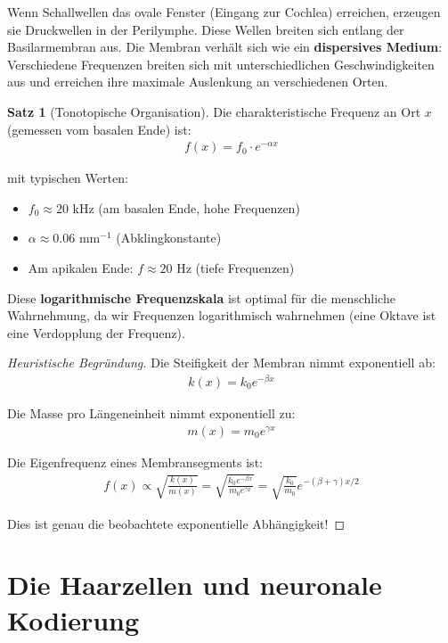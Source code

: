 ﻿\documentclass[a4paper,12pt]{report}
\theoremstyle{definition}
\newtheorem{satz}{Satz}
\begin{document}
	Wenn Schallwellen das ovale Fenster (Eingang zur Cochlea) erreichen, erzeugen sie Druckwellen in der Perilymphe. Diese Wellen breiten sich entlang der Basilarmembran aus. Die Membran verhält sich wie ein \textbf{dispersives Medium}: Verschiedene Frequenzen breiten sich mit unterschiedlichen Geschwindigkeiten aus und erreichen ihre maximale Auslenkung an verschiedenen Orten.
	
	\begin{satz}[Tonotopische Organisation]
		Die charakteristische Frequenz an Ort $x$ (gemessen vom basalen Ende) ist:
		\begin{align}
			f(x) = f_0 \cdot e^{-\alpha x}
		\end{align}
		
		mit typischen Werten:
		\begin{itemize}
			\item[-] $f_0 \approx 20$ kHz (am basalen Ende, hohe Frequenzen)
			\item[-] $\alpha \approx 0.06$ mm$^{-1}$ (Abklingkonstante)
			\item[-] Am apikalen Ende: $f \approx 20$ Hz (tiefe Frequenzen)
		\end{itemize}
		
		Diese \textbf{logarithmische Frequenzskala} ist optimal für die menschliche Wahrnehmung, da wir Frequenzen logarithmisch wahrnehmen (eine Oktave ist eine Verdopplung der Frequenz).
	\end{satz}
	
	\begin{proof}[Heuristische Begründung]
		Die Steifigkeit der Membran nimmt exponentiell ab:
		\begin{align}
			k(x) = k_0 e^{-\beta x}
		\end{align}
		
		Die Masse pro Längeneinheit nimmt exponentiell zu:
		\begin{align}
			m(x) = m_0 e^{\gamma x}
		\end{align}
		
		Die Eigenfrequenz eines Membransegments ist:
		\begin{align}
			f(x) \propto \sqrt{\frac{k(x)}{m(x)}} = \sqrt{\frac{k_0 e^{-\beta x}}{m_0 e^{\gamma x}}} = \sqrt{\frac{k_0}{m_0}} e^{-(\beta + \gamma)x/2}
		\end{align}
		
		Dies ist genau die beobachtete exponentielle Abhängigkeit!
	\end{proof}
	
	\section{Die Haarzellen und neuronale Kodierung}
	
\end{document}
